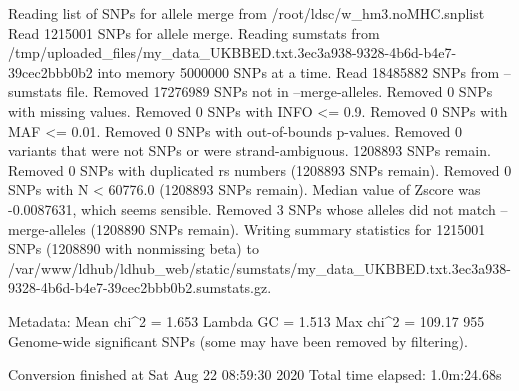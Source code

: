Reading list of SNPs for allele merge from /root/ldsc/w_hm3.noMHC.snplist
Read 1215001 SNPs for allele merge.
Reading sumstats from /tmp/uploaded_files/my_data_UKBBED.txt.3ec3a938-9328-4b6d-b4e7-39cec2bbb0b2 into memory 5000000 SNPs at a time.
Read 18485882 SNPs from --sumstats file.
Removed 17276989 SNPs not in --merge-alleles.
Removed 0 SNPs with missing values.
Removed 0 SNPs with INFO <= 0.9.
Removed 0 SNPs with MAF <= 0.01.
Removed 0 SNPs with out-of-bounds p-values.
Removed 0 variants that were not SNPs or were strand-ambiguous.
1208893 SNPs remain.
Removed 0 SNPs with duplicated rs numbers (1208893 SNPs remain).
Removed 0 SNPs with N < 60776.0 (1208893 SNPs remain).
Median value of Zscore was -0.0087631, which seems sensible.
Removed 3 SNPs whose alleles did not match --merge-alleles (1208890 SNPs remain).
Writing summary statistics for 1215001 SNPs (1208890 with nonmissing beta) to /var/www/ldhub/ldhub_web/static/sumstats/my_data_UKBBED.txt.3ec3a938-9328-4b6d-b4e7-39cec2bbb0b2.sumstats.gz.

Metadata:
Mean chi^2 = 1.653
Lambda GC = 1.513
Max chi^2 = 109.17
955 Genome-wide significant SNPs (some may have been removed by filtering).

Conversion finished at Sat Aug 22 08:59:30 2020
Total time elapsed: 1.0m:24.68s
